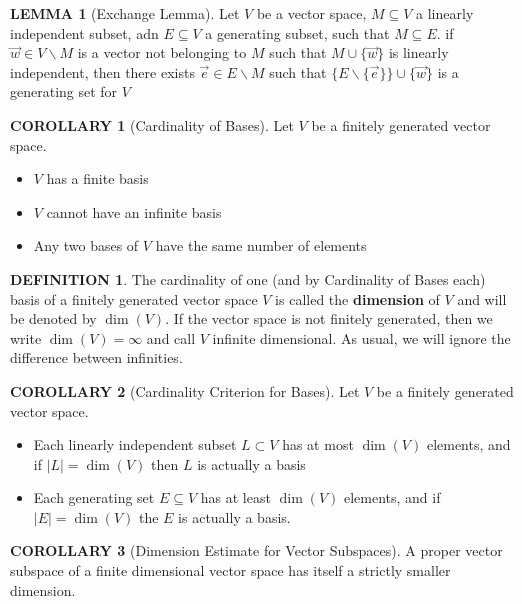 \documentclass[12pt]{article}
\theoremstyle{definition}
\newtheorem{definition}{DEFINITION}[subsection]
\newtheorem{lemma}{LEMMA}[subsection]
\newtheorem{corollary}{COROLLARY}[subsection]
\begin{document}
\begin{lemma}[Exchange Lemma]
    Let $V$ be a vector space, $M \subseteq V$ a linearly independent subset, adn $E \subseteq V$ a generating subset, such that $M \subseteq E$. if $\overrightarrow{w} \in V\backslash M$ is a vector not belonging to $M$ such that $M \cup \{\overrightarrow{w}\}$ is linearly independent, then there exists $\overrightarrow{e} \in E\backslash M$ such that $\{E\backslash\{\overrightarrow{e}\}\}\cup \{\overrightarrow{w}\}$ is a generating set for $V$
\end{lemma}

\begin{corollary}[Cardinality of Bases]
    Let $V$ be a finitely generated vector space.
    \begin{itemize}
        \item $V$ has a finite basis
        \item $V$ cannot have an infinite basis
        \item Any two bases of $V$ have the same number of elements
    \end{itemize}
\end{corollary}

\begin{definition}
    The cardinality of one (and by Cardinality of Bases each) basis of a finitely generated vector space $V$ is called the \textbf{dimension} of $V$ and will be denoted by $\dim(V)$. If the vector space is not finitely generated, then we write $\dim(V) = \infty$ and call $V$ infinite dimensional. As usual, we will ignore the difference between infinities.
\end{definition}

\begin{corollary}[Cardinality Criterion for Bases]
    Let $V$ be a finitely generated vector space.
    \begin{itemize}
        \item Each linearly independent subset $L \subset V$ has at most $\dim(V)$ elements, and if $|L|=\dim(V)$ then $L$ is actually a basis
        \item Each generating set $E \subseteq V$ has at least $\dim(V)$ elements, and if $|E| = \dim(V)$ the $E$ is actually a basis.
    \end{itemize}
\end{corollary}

\begin{corollary}[Dimension Estimate for Vector Subspaces]
    A proper vector subspace of a finite dimensional vector space has itself a strictly smaller dimension.
\end{corollary}
\end{document}
